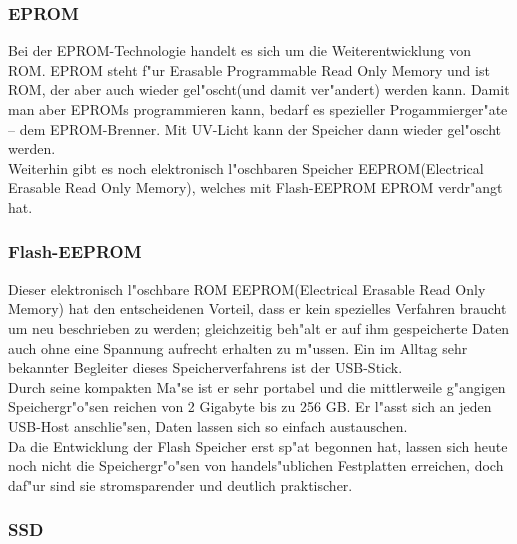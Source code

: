 				\subsubsection{EPROM}
				\label{ch:Technisch:sec:Elektronische Speicherung:sub:Fl"uchtig:subsub:EPROM}
					
					Bei der EPROM-Technologie handelt es sich um die Weiterentwicklung von ROM. EPROM steht f"ur \glqq Erasable Programmable Read Only Memory\grqq{} und ist ROM, der aber auch wieder gel"oscht(und damit ver"andert) werden kann. Damit man aber EPROMs programmieren kann, bedarf es spezieller Progammierger"ate – dem \glqq EPROM-Brenner\grqq{}. Mit UV-Licht kann der Speicher dann wieder gel"oscht werden.
					\\
					Weiterhin gibt es noch elektronisch l"oschbaren Speicher EEPROM(\glqq Electrical Erasable Read Only Memory\grqq{}), welches mit Flash-EEPROM EPROM verdr"angt hat.
				
				\subsubsection{Flash-EEPROM}
				\label{ch:Technisch:sec:Elektronische Speicherung:sub:Fl"uchtig:subsub:Flash-EEPROM}
				
					Dieser elektronisch l"oschbare ROM EEPROM(\glqq Electrical Erasable Read Only Memory\grqq{}) hat den entscheidenen Vorteil, dass er kein spezielles Verfahren braucht um neu beschrieben zu werden; gleichzeitig beh"alt er auf ihm gespeicherte Daten auch ohne eine Spannung aufrecht erhalten zu m"ussen. Ein im Alltag sehr bekannter Begleiter dieses Speicherverfahrens ist der USB-Stick. 
					\\
					Durch seine kompakten Ma"se ist er sehr portabel und die mittlerweile g"angigen Speichergr"o"sen reichen von 2 Gigabyte bis zu 256 GB. Er l"asst sich an jeden USB-Host anschlie"sen, Daten lassen sich so einfach austauschen. 
					\\
					Da die Entwicklung der Flash Speicher erst sp"at begonnen hat, lassen sich heute noch nicht die Speichergr"o"sen von handels"ublichen Festplatten erreichen, doch daf"ur sind sie stromsparender und deutlich praktischer.
				
				\subsubsection{SSD}
				\label{ch:Technisch:sec:Elektronische Speicherung:sub:Fl"uchtig:subsub:SSD}
				
